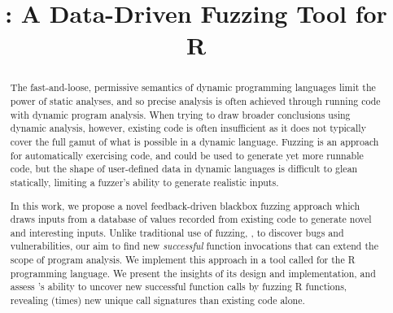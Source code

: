 \documentclass[sigplan,anonymous,review]{acmart}
\begin{document}
\title{\tool: A Data-Driven Fuzzing Tool for R}

\begin{abstract}

The fast-and-loose, permissive semantics of dynamic programming languages limit the power of static analyses, and so precise analysis is often achieved through running code with dynamic program analysis. 
When trying to draw broader conclusions using dynamic analysis, however, existing code is often insufficient as it does not typically cover the full gamut of what is possible in a dynamic language.
Fuzzing is an approach for automatically exercising code, and could be used to generate yet more runnable code, but the shape of user-defined data in dynamic languages is difficult to glean statically, limiting a fuzzer's ability to generate realistic inputs.



In this work, we propose a novel feedback-driven blackbox fuzzing approach which draws inputs from a database of values recorded from existing code to generate novel and interesting inputs.
Unlike traditional use of fuzzing, \Ie, to discover bugs and vulnerabilities, our aim to find new \textit{successful} function invocations that can extend the scope of program analysis.
We implement this approach in a tool called \tool for the R programming language.
We present the insights of its design and implementation, and assess \tool's ability to uncover new successful function calls by fuzzing \UFNumFunctions R functions, revealing \UFSignatrSignatures (\UFSignatrBaselineSignaturesRatio times) new unique call signatures than existing code alone.



\end{abstract}
\end{document}
